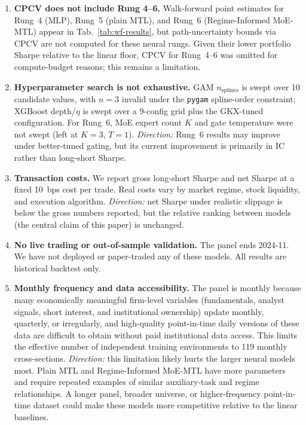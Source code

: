 \documentclass[11pt]{article}
\begin{document}
\begin{enumerate}[leftmargin=2em,topsep=2pt,itemsep=4pt]
\item \textbf{CPCV does not include Rung 4--6.} Walk-forward point
  estimates for Rung~4 (MLP), Rung~5 (plain MTL), and Rung~6
  (Regime-Informed MoE-MTL) appear in Tab.~\ref{tab:wf-results}, but
  path-uncertainty bounds via CPCV are not computed for these neural
  rungs. Given their lower portfolio Sharpe relative to the linear
  floor, CPCV for Rung~4--6 was omitted for compute-budget reasons;
  this remains a limitation.

\item \textbf{Hyperparameter search is not exhaustive.} GAM
  $n_{\text{splines}}$ is swept over 10 candidate values, with $n=3$
  invalid under the \texttt{pygam} spline-order constraint; XGBoost
  depth/$\eta$ is swept over a 9-config grid plus the GKX-tuned
  configuration. For Rung~6, MoE expert count $K$ and gate temperature
  were not swept (left at $K{=}3$, $T{=}1$). \emph{Direction:}
  Rung~6 results may improve under better-tuned gating, but its current
  improvement is primarily in IC rather than long-short Sharpe.

\item \textbf{Transaction costs.} We report gross long-short Sharpe
  and net Sharpe at a fixed 10~bps cost per trade. Real costs vary by
  market regime, stock liquidity, and execution algorithm. \emph{Direction:}
  net Sharpe under realistic slippage is below the gross numbers
  reported, but the relative ranking between models (the central claim
  of this paper) is unchanged.

\item \textbf{No live trading or out-of-sample validation.} The panel
  ends 2024-11. We have not deployed or paper-traded any of these
  models. All results are historical backtest only.

\item \textbf{Monthly frequency and data accessibility.} The panel is
monthly because many economically meaningful firm-level variables
(fundamentals, analyst signals, short interest, and institutional
ownership) update monthly, quarterly, or irregularly, and high-quality
point-in-time daily versions of these data are difficult to obtain
without paid institutional data access. This limits the effective
number of independent training environments to 119 monthly
cross-sections. \emph{Direction:} this limitation likely hurts the
larger neural models most. Plain MTL and Regime-Informed MoE-MTL have
more parameters and require repeated examples of similar auxiliary-task
and regime relationships. A longer panel, broader universe, or
higher-frequency point-in-time dataset could make these models more
competitive relative to the linear baselines.

\end{enumerate}
\end{document}
